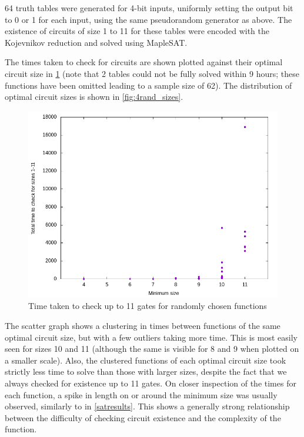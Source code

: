 \documentclass{article}
\begin{document}
64 truth tables were generated for 4-bit inputs, uniformly setting the output bit to 0 or 1 for each input, using the same pseudorandom generator as above. The existence of circuits of size 1 to 11 for these tables were encoded with the Kojevnikov reduction and solved using MapleSAT. 

The times taken to check for circuits are shown plotted against their optimal circuit size in \ref{fig:4rand_scatter} (note that 2 tables could not be fully solved within 9 hours; these functions have been omitted leading to a sample size of 62). The distribution of optimal circuit sizes is shown in \ref{fig:4rand_sizes}.

\begin{figure}[!h]
  \includegraphics[width=\textwidth]{images/random/4bit_scatter.png}
  \caption{Time taken to check up to 11 gates for randomly chosen functions}
  \label{fig:4rand_scatter}
\end{figure}

The scatter graph shows a clustering in times between functions of the same optimal circuit size, but with a few outliers taking more time. This is most easily seen for sizes 10 and 11 (although the same is visible for 8 and 9 when plotted on a smaller scale). Also, the clustered functions of each optimal circuit size took strictly less time to solve than those with larger sizes, despite the fact that we always checked for existence up to 11 gates. On closer inspection of the times for each function, a spike in length on or around the minimum size was usually observed, similarly to in \ref{satresults}. This shows a generally strong relationship between the difficulty of checking circuit existence and the complexity of the function.
\end{document}
